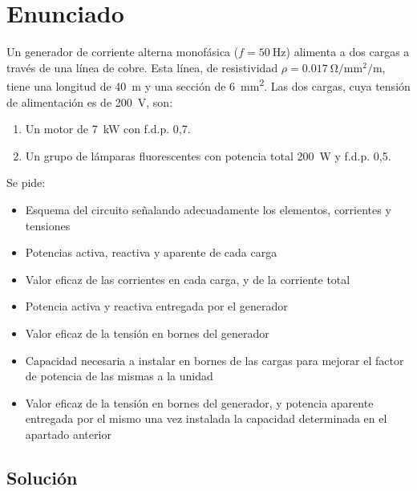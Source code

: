 \section{Enunciado}
Un generador de corriente alterna monofásica ($f = \qty{50}{\hertz}$) alimenta
a dos cargas a través de una línea de cobre. Esta línea, de
resistividad $\rho = \qty{0.017}{\ohm\per\milli\meter\squared\per\meter}$, tiene una longitud de
\qty{40}{\meter} y una sección de \qty{6}{\milli\meter\squared}. Las dos cargas, cuya tensión de
alimentación es de \qty{200}{\volt}, son:
\begin{enumerate}
\item Un motor de \qty{7}{\kilo\watt} con f.d.p. {0,7}.
\item Un grupo de lámparas fluorescentes con potencia total \qty{200}{\watt} y
  f.d.p. {0,5}.
\end{enumerate}
Se pide:
\begin{itemize}
\item Esquema del circuito señalando adecuadamente los elementos,
  corrientes y tensiones
\item Potencias activa, reactiva y aparente de cada carga
\item Valor eficaz de las corrientes en cada carga, y de la corriente
  total
\item Potencia activa y reactiva entregada por el generador
\item Valor eficaz de la tensión en bornes del generador
\item Capacidad necesaria a instalar en bornes de las cargas para
  mejorar el factor de potencia de las mismas a la unidad
\item Valor eficaz de la tensión en bornes del generador, y potencia
  aparente entregada por el mismo una vez instalada la capacidad
  determinada en el apartado anterior
\end{itemize}

\subsection*{Solución}


